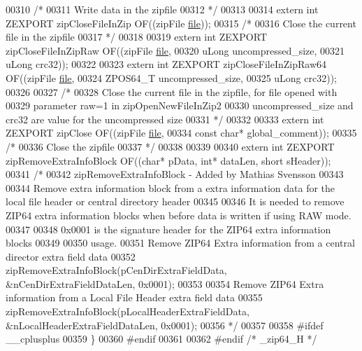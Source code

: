 \begin{DoxyCode}
00310 \textcolor{comment}{/*}
00311 \textcolor{comment}{  Write data in the zipfile}
00312 \textcolor{comment}{*/}
00313 
00314 \textcolor{keyword}{extern} \textcolor{keywordtype}{int} ZEXPORT zipCloseFileInZip OF((zipFile \hyperlink{structfile}{file}));
00315 \textcolor{comment}{/*}
00316 \textcolor{comment}{  Close the current file in the zipfile}
00317 \textcolor{comment}{*/}
00318 
00319 \textcolor{keyword}{extern} \textcolor{keywordtype}{int} ZEXPORT zipCloseFileInZipRaw OF((zipFile \hyperlink{structfile}{file},
00320                                             uLong uncompressed\_size,
00321                                             uLong crc32));
00322 
00323 \textcolor{keyword}{extern} \textcolor{keywordtype}{int} ZEXPORT zipCloseFileInZipRaw64 OF((zipFile \hyperlink{structfile}{file},
00324                                             ZPOS64\_T uncompressed\_size,
00325                                             uLong crc32));
00326 
00327 \textcolor{comment}{/*}
00328 \textcolor{comment}{  Close the current file in the zipfile, for file opened with}
00329 \textcolor{comment}{    parameter raw=1 in zipOpenNewFileInZip2}
00330 \textcolor{comment}{  uncompressed\_size and crc32 are value for the uncompressed size}
00331 \textcolor{comment}{*/}
00332 
00333 \textcolor{keyword}{extern} \textcolor{keywordtype}{int} ZEXPORT zipClose OF((zipFile \hyperlink{structfile}{file},
00334                 \textcolor{keyword}{const} \textcolor{keywordtype}{char}* global\_comment));
00335 \textcolor{comment}{/*}
00336 \textcolor{comment}{  Close the zipfile}
00337 \textcolor{comment}{*/}
00338 
00339 
00340 \textcolor{keyword}{extern} \textcolor{keywordtype}{int} ZEXPORT zipRemoveExtraInfoBlock OF((\textcolor{keywordtype}{char}* pData, \textcolor{keywordtype}{int}* dataLen, \textcolor{keywordtype}{short} sHeader));
00341 \textcolor{comment}{/*}
00342 \textcolor{comment}{  zipRemoveExtraInfoBlock -  Added by Mathias Svensson}
00343 \textcolor{comment}{}
00344 \textcolor{comment}{  Remove extra information block from a extra information data for the local file header or central
       directory header}
00345 \textcolor{comment}{}
00346 \textcolor{comment}{  It is needed to remove ZIP64 extra information blocks when before data is written if using RAW mode.}
00347 \textcolor{comment}{}
00348 \textcolor{comment}{  0x0001 is the signature header for the ZIP64 extra information blocks}
00349 \textcolor{comment}{}
00350 \textcolor{comment}{  usage.}
00351 \textcolor{comment}{                        Remove ZIP64 Extra information from a central director extra field data}
00352 \textcolor{comment}{              zipRemoveExtraInfoBlock(pCenDirExtraFieldData, &nCenDirExtraFieldDataLen, 0x0001);}
00353 \textcolor{comment}{}
00354 \textcolor{comment}{                        Remove ZIP64 Extra information from a Local File Header extra field data}
00355 \textcolor{comment}{        zipRemoveExtraInfoBlock(pLocalHeaderExtraFieldData, &nLocalHeaderExtraFieldDataLen, 0x0001);}
00356 \textcolor{comment}{*/}
00357 
00358 \textcolor{preprocessor}{#ifdef \_\_cplusplus}
00359 \}
00360 \textcolor{preprocessor}{#endif}
00361 
00362 \textcolor{preprocessor}{#endif }\textcolor{comment}{/* \_zip64\_H */}\textcolor{preprocessor}{}
\end{DoxyCode}
